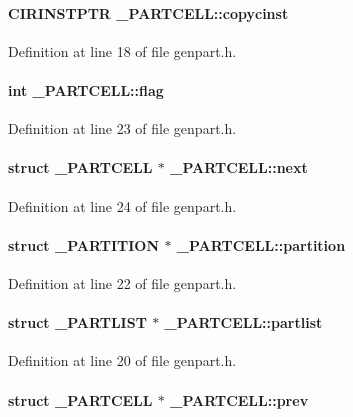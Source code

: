 \paragraph{\setlength{\rightskip}{0pt plus 5cm}CIRINSTPTR \_\-PARTCELL::copycinst}\hfill



Definition at line 18 of file genpart.h.\label{_PARTCELL_m6}
\paragraph{\setlength{\rightskip}{0pt plus 5cm}int \_\-PARTCELL::flag}\hfill



Definition at line 23 of file genpart.h.\label{_PARTCELL_m7}
\paragraph{\setlength{\rightskip}{0pt plus 5cm}struct \_\-PARTCELL $\ast$ \_\-PARTCELL::next}\hfill



Definition at line 24 of file genpart.h.\label{_PARTCELL_m5}
\paragraph{\setlength{\rightskip}{0pt plus 5cm}struct {\bf \_\-PARTITION} $\ast$ \_\-PARTCELL::partition}\hfill



Definition at line 22 of file genpart.h.\label{_PARTCELL_m3}
\paragraph{\setlength{\rightskip}{0pt plus 5cm}struct {\bf \_\-PARTLIST} $\ast$ \_\-PARTCELL::partlist}\hfill



Definition at line 20 of file genpart.h.\label{_PARTCELL_m8}
\paragraph{\setlength{\rightskip}{0pt plus 5cm}struct \_\-PARTCELL $\ast$ \_\-PARTCELL::prev}\hfill



